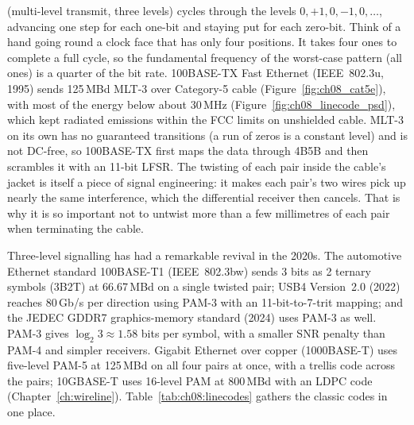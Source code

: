 
 (multi-level transmit, three levels) cycles through the levels
$0,+1,0,-1,0,\dots$, advancing one step for each one-bit and staying put for each zero-bit.
Think of a hand going round a clock face that has only four positions. It takes four ones to
complete a full cycle, so the fundamental frequency of the worst-case pattern (all ones) is a
quarter of the bit rate. 100BASE-TX Fast Ethernet (IEEE~802.3u, 1995) sends 125\,MBd MLT-3
over Category-5 cable (Figure~\ref{fig:ch08_cat5e}), with most of the energy below about
30\,MHz (Figure~\ref{fig:ch08_linecode_psd}), which kept radiated emissions within the FCC
limits on unshielded cable. MLT-3 on its own has no guaranteed transitions (a run of zeros is
a constant level) and is not DC-free, so 100BASE-TX first maps the data through 4B5B and then
scrambles it with an 11-bit LFSR. The twisting of each pair inside the cable's jacket is
itself a piece of signal engineering: it makes each pair's two wires pick up nearly the same
interference, which the differential receiver then cancels. That is why it is so important
not to untwist more than a few millimetres of each pair when terminating the cable.

Three-level signalling has had a remarkable revival in the 2020s. The automotive Ethernet
standard 100BASE-T1 (IEEE~802.3bw) sends 3 bits as 2 ternary symbols (3B2T) at 66.67\,MBd
on a single twisted pair; USB4 Version~2.0 (2022) reaches 80\,Gb/s per direction using
PAM-3 with an 11-bit-to-7-trit mapping; and the JEDEC GDDR7 graphics-memory standard (2024)
uses PAM-3 as well. PAM-3 gives $\log_2 3\approx1.58$ bits per symbol, with a smaller SNR
penalty than PAM-4 and simpler receivers. Gigabit Ethernet over copper (1000BASE-T) uses
five-level PAM-5 at 125\,MBd on all four pairs at once, with a trellis code across the pairs;
10GBASE-T uses 16-level PAM at 800\,MBd with an LDPC code (Chapter~\ref{ch:wireline}).
Table~\ref{tab:ch08:linecodes} gathers the classic codes in one place.

